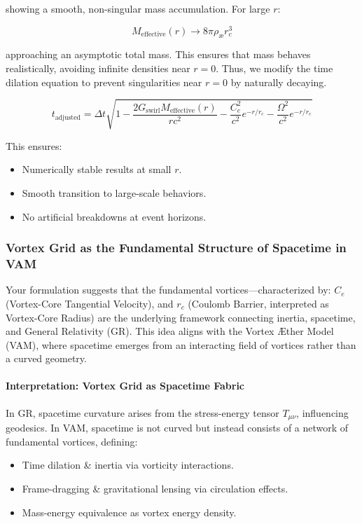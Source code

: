 showing a smooth, non-singular mass accumulation. For large $r$:

\begin{equation*}
    M_\text{effective}(r) \to 8\pi \rho_\text{\ae} r_c^3
\end{equation*}

approaching an asymptotic total mass. This ensures that mass behaves realistically, avoiding infinite densities near $r=0$. Thus, we modify the time dilation equation to prevent singularities near $r = 0$ by naturally decaying.

\begin{equation*}
    \boxed{t_\text{adjusted} = \Delta t \sqrt{1 - \frac{2  G_\text{swirl} M_\text{effective}(r)}{r c^2} - \frac{C_e^2}{c^2} e^{-r/r_c} - \frac{\Omega^2}{c^2} e^{-r/r_c}}}
\end{equation*}

This ensures:
\begin{itemize}
    \item Numerically stable results at small $r$.
    \item Smooth transition to large-scale behaviors.
    \item No artificial breakdowns at event horizons.
\end{itemize}




\subsubsection*{Vortex Grid as the Fundamental Structure of Spacetime in VAM}
Your formulation suggests that the fundamental vortices—characterized by:
$C_e$ (Vortex-Core Tangential Velocity), and
$r_c$ (Coulomb Barrier, interpreted as Vortex-Core Radius)
are the underlying framework connecting inertia, spacetime, and General Relativity (GR). This idea aligns with the Vortex Æther Model (VAM), where spacetime emerges from an interacting field of vortices rather than a curved geometry.

\paragraph{Interpretation: Vortex Grid as Spacetime Fabric}
In GR, spacetime curvature arises from the stress-energy tensor $T_{\mu\nu}$, influencing geodesics.
In VAM, spacetime is not curved but instead consists of a network of fundamental vortices, defining:
\begin{itemize}
    \item Time dilation \& inertia via vorticity interactions.
    \item Frame-dragging \& gravitational lensing via circulation effects.
    \item Mass-energy equivalence as vortex energy density.
\end{itemize}

